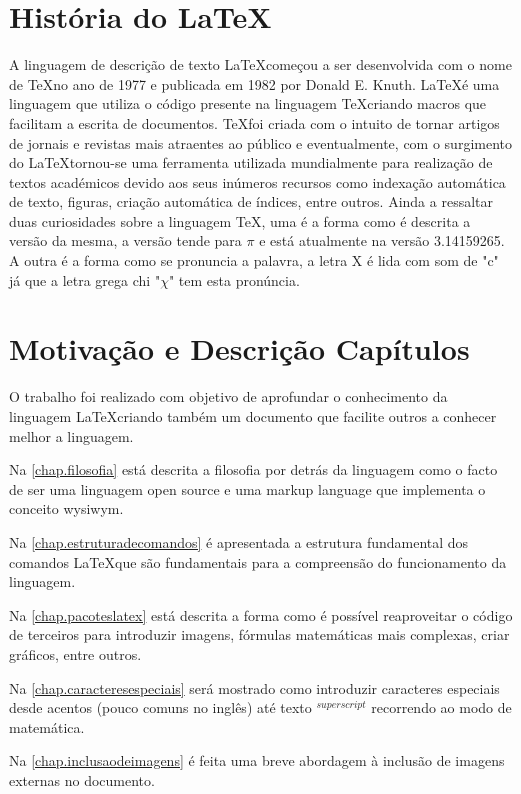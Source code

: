 \section{História do \LaTeX}
A linguagem de descrição de texto \LaTeX começou a ser desenvolvida com o nome de \TeX  no ano de 1977 e publicada em 1982 por Donald E. Knuth. \LaTeX é uma linguagem que utiliza o código presente na linguagem \TeX criando macros que facilitam a escrita de documentos. \TeX foi criada com o intuito de tornar artigos de jornais e revistas mais atraentes ao público e eventualmente, com o surgimento do \LaTeX tornou-se uma ferramenta utilizada mundialmente para realização de textos académicos devido aos seus inúmeros recursos como indexação automática de texto, figuras, criação automática de índices, entre outros. Ainda a ressaltar duas curiosidades sobre a linguagem \TeX , uma é a forma como é descrita a versão da mesma, a versão tende para $\pi$ e está atualmente na versão 3.14159265. A outra é a forma como se pronuncia a palavra, a letra X é lida com som de "c" já que a letra grega chi "$\chi$" tem esta pronúncia.

\section{Motivação e Descrição Capítulos}
O trabalho foi realizado com objetivo de aprofundar o conhecimento da linguagem \LaTeX criando também um documento que facilite outros a conhecer melhor a linguagem.

Na \autoref{chap.filosofia} está descrita a filosofia por detrás da linguagem como o facto de ser uma linguagem open source e uma markup language que implementa o conceito \ac{wysiwym}.

Na \autoref{chap.estruturadecomandos} é apresentada a estrutura fundamental dos comandos \LaTeX que são fundamentais para a compreensão do funcionamento da linguagem.

Na \autoref{chap.pacoteslatex} está descrita a forma como é possível reaproveitar o código de terceiros para introduzir imagens, fórmulas matemáticas mais complexas, criar gráficos, entre outros.

Na \autoref{chap.caracteresespeciais} será mostrado como introduzir caracteres especiais desde acentos (pouco comuns no inglês) até texto  $^{superscript}$ recorrendo ao modo de matemática.

Na \autoref{chap.inclusaodeimagens} é feita uma breve abordagem à inclusão de imagens externas no documento.

